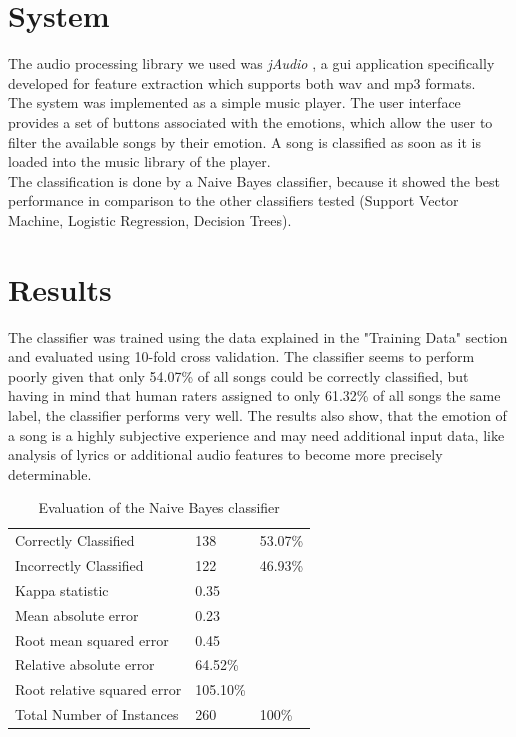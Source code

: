 \documentclass{sigchi-ext}
\begin{document}
\section{System}
The audio processing library we used was \textit{jAudio} \cite{McEnnis2005}, a gui application specifically developed for feature extraction which supports both wav and mp3 formats.\\
The system was implemented as a simple music player. The user interface provides a set of buttons associated with the emotions, which allow the user to filter the available songs by their emotion. A song is classified as soon as it is loaded into the music library of the player.\\
The classification is done by a Naive Bayes classifier, because it showed the best performance in comparison to the other classifiers tested (Support Vector Machine, Logistic Regression, Decision Trees).

\section{Results}
The classifier was trained using the data explained in the "Training Data" section and evaluated using 10-fold cross validation. The classifier seems to perform poorly given that only 54.07\% of all songs could be correctly classified, but having in mind that human raters assigned to only 61.32\% of all songs the same label, the classifier performs very well. The results also show, that the emotion of a song is a highly subjective experience and may need additional input data, like analysis of lyrics or additional audio features to become more precisely determinable.

\begin{table}
  \centering
  \begin{tabular}{@{}lll@{}}
    Correctly Classified          & 138       & 53.07\% \\
    Incorrectly Classified        & 122       & 46.93\% \\
    Kappa statistic 				      & 0.35      & \\
    Mean absolute error  			    & 0.23      & \\
    Root mean squared error 	    & 0.45      & \\
    Relative absolute error 	    & 64.52\%   & \\
    Root relative squared error   & 105.10\%  & \\
    Total Number of Instances     & 260       & 100\%
  \end{tabular}
  \caption{Evaluation of the Naive Bayes classifier}
\end{table}
\end{document}
